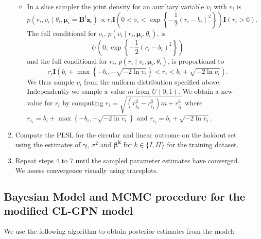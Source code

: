 \documentclass[12pt,]{article}
\begin{document}
\begin{enumerate}
\begin{itemize}
\item In a slice sampler the joint density for an auxiliary variable $v_{i}$ with $r_{i}$ is
$$p(r_{i}, v_{i}\mid \theta_{i}, \boldsymbol{\mu}_{i}=\boldsymbol{B}^t\boldsymbol{z}_{i}) \propto r_{i} \textbf{I}\left(0 < v_i < \exp\left\{ -\frac{1}{2}(r_{i} - b_{i})^2\right\}\right)\textbf{I}(r_i > 0).$$
\noindent The full conditional for $v_{i}$, $p(v_{i} \mid r_{i},\boldsymbol{\mu}_{i}, \theta_{i})$, is
$$U\left(0, \exp\left\{-\frac{1}{2}(r_{i} -  b _{i})^2\right\}\right)$$
and the full conditional for $r_i$, $p(r_{i} \mid v_{i},\boldsymbol{\mu}_{i}, \theta_{i})$, is proportional to
$$r_{i} \textbf{I}\left(b_{i} + \max\left\{-b_{i}, -\sqrt{-2\ln v_{i}}\right\} < r_{i} < b_{i} + \sqrt{-2\ln v_{i}}\right).$$
\noindent We thus sample $v_{i}$ from the uniform distribution specified above. Independently we sample a value $m$ from $U(0,1)$. We obtain a new value for $r_{i}$ by computing $ r_{i} = \sqrt{(r_{i_{2}}^{2}-r_{i_{1}}^{2})m + r_{i_{1}}^{2}}$ where $r_{i_{1}}=b_{i} +\max\left\{-b_{i}, -\sqrt{-2\ln v_{i}}\right\}$ and $ r_{i_{2}}= b_{i} + \sqrt{-2\ln v_{i}}$.
\end{itemize}
\item Compute the PLSL for the circular and linear outcome on the holdout set using the estimates of $\boldsymbol{\gamma}$, $\sigma^2$ and $\boldsymbol{\beta^{k}}$ for $k \in \{I,II\}$ for the training dataset.
\item Repeat steps 4 to 7 until the sampled parameter estimates have converged. We assess convergence visually using traceplots.
\end{enumerate}

\newpage

\subsection{Bayesian Model and MCMC procedure for the modified CL-GPN model}\label{A2}

We use the following algorithm to obtain posterior estimates from the
model:
\end{document}
